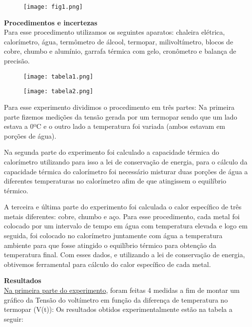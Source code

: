 \documentclass[a4paper, 12pt]{article}
\begin{document}
		\begin{figure}[!h]
		\centering
		\texttt{[image: fig1.png]}
		\end{figure}

\pagebreak



\textbf{Procedimentos e incertezas}
\\

Para esse procedimento utilizamos os seguintes aparatos: chaleira elétrica, calorímetro, água, termômetro de álcool, termopar, milivoltímetro, blocos de cobre, chumbo e alumínio, garrafa térmica com gelo, cronômetro e balança de precisão.

\begin{figure}[!h]
		\centering
		\texttt{[image: tabela1.png]}
		\end{figure}

\begin{figure}[!h]
		\centering
		\texttt{[image: tabela2.png]}
		\end{figure}

Para esse experimento dividimos o procedimento em três partes: Na primeira parte fizemos medições da tensão gerada por um termopar sendo que um lado estava  a 0ºC e o outro lado a temperatura foi variada (ambos estavam em porções de água). 

Na segunda parte do experimento foi calculado a capacidade térmica do calorímetro utilizando para isso a lei de conservação de energia, para o cálculo da capacidade térmica do calorímetro foi necessário misturar duas porções de água a diferentes temperaturas no calorímetro afim de que atingissem o equilíbrio térmico.

A terceira e última parte do experimento foi calculada o calor específico de três metais diferentes: cobre, chumbo e aço. Para esse procedimento, cada metal foi colocado por um intervalo de tempo em água com temperatura elevada e logo em seguida, foi colocado no calorímetro juntamente com água a temperatura ambiente para que fosse atingido o equilíbrio térmico para obtenção da temperatura final. Com esses dados, e utilizando a lei de conservação de energia, obtivemos ferramental para cálculo do calor específico  de cada metal.


\pagebreak


\textbf{Resultados}
\\

\underline{Na primeira parte do experimento}, foram feitas 4 medidas a fim de montar um gráfico da Tensão do voltímetro em função da diferença de temperatura no termopar (V(t)):
Os resultados obtidos experimentalmente estão na tabela a seguir:
\end{document}
